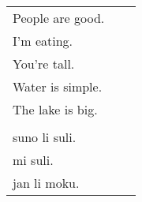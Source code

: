 \begin{supertabular}{p{5cm}|ll}
People are good. && \\ %
I'm eating. &&  \\ %
You're tall. &&  \\ %
Water is simple. &&  \\ %
The lake is big. &&\\ %
 && \\
suno li suli. &&  \\%
mi suli. &&  \\%
jan li moku. &&  \\%
\end{supertabular} \\%
%
